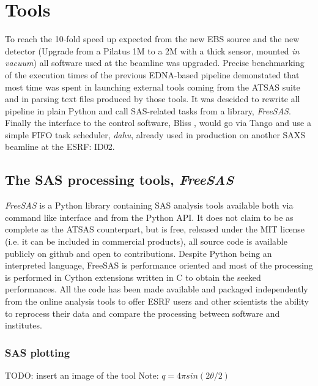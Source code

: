 \documentclass[preprint]{iucr}              %
\begin{document}
\section{Tools}

To reach the 10-fold speed up expected from the new EBS source and the new detector (Upgrade from a Pilatus 1M to a 2M with a thick sensor, mounted \textit{in vacuum})
all software used at the beamline was upgraded.
Precise benchmarking of the execution times of the previous EDNA-based pipeline demonstated that 
most time was spent in launching external tools coming from the ATSAS suite and in parsing text files produced by those tools.
It was descided to rewrite all pipeline in plain Python \cite{Python} and call SAS-related tasks from a library, \textit{FreeSAS}. 
Finally the interface to the control software, Bliss \cite{bliss}, would go via Tango \cite{tango} and use a simple FIFO task scheduler,  \textit{dahu}, 
already used in production on another SAXS beamline at the ESRF: ID02\cite{ID02}.   

\subsection{The SAS processing tools, \textit{FreeSAS}}

\textit{FreeSAS} is a Python\cite{python} library containing SAS analysis tools available both via command like interface and from the Python API. 
It does not claim to be as complete as the ATSAS counterpart,
but is free, released under the MIT license (i.e. it can be included in commercial products), all source code is available publicly on github \cite{freesas} and
open to contributions.
Despite Python being an interpreted language, FreeSAS is performance oriented and most of the processing is performed in Cython\cite{cython} extensions written in C 
to obtain the seeked performances. 
All the code has been made available and packaged independently from the online analysis tools to offer ESRF users and other scientists
the ability to reprocess their data and compare the processing between software and institutes.

\subsubsection{SAS plotting}

TODO: insert an image  of the tool
Note:
$q = 4\pi sin(2\theta/2)$
\end{document}

